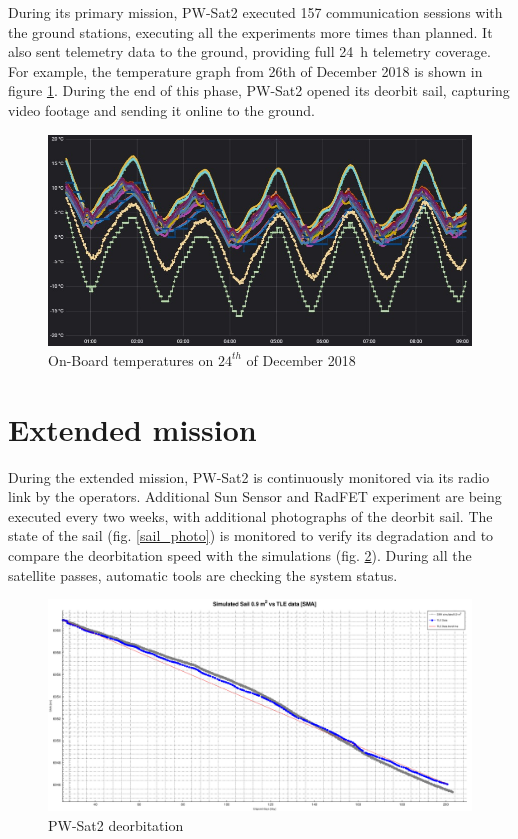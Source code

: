 During its primary mission, PW-Sat2 executed \si{157} communication sessions with the ground stations, executing all the experiments more times than planned. It also sent telemetry data to the ground, providing full \SI{24}{\hour} telemetry coverage. For example, the temperature graph from 26th of December 2018 is shown in figure \ref{onboard_temps}. During the end of this phase, PW-Sat2 opened its deorbit sail, capturing video footage and sending it online to the ground.

\begin{figure}[H]
    \centering
    \includegraphics[width=0.65\paperwidth]{img/9/temps_24_12.jpg}
    \caption{On-Board temperatures on $24^{th}$ of December 2018}
    \label{onboard_temps}
\end{figure}

\section{Extended mission}
During the extended mission, PW-Sat2 is continuously monitored via its radio link by the operators. Additional Sun Sensor and RadFET experiment are being executed every two weeks, with additional photographs of the deorbit sail. The state of the sail (fig. \ref{sail_photo}) is monitored to verify its degradation and to compare the deorbitation speed with the simulations (fig. \ref{deorbitation}). During all the satellite passes, automatic tools are checking the system status.

\begin{figure}[H]
    \centering
    \includegraphics[width=0.65\paperwidth]{img/9/deorbitation.png}
    \caption{PW-Sat2 deorbitation}
    \label{deorbitation}
\end{figure}

